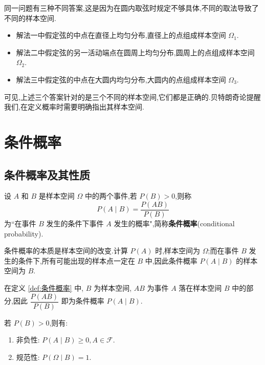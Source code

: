 \begin{note}
    \indent 同一问题有三种不同答案,这是因为在圆内取弦时规定不够具体,不同的取法导致了不同的样本空间.

    \begin{itemize}
        \item 解法一中假定弦的中点在直径上均匀分布,直径上的点组成样本空间 $\varOmega_1$.
        \item 解法二中假定弦的另一活动端点在圆周上均匀分布,圆周上的点组成样本空间 $\varOmega_2$.
        \item 解法三中假定弦的中点在大圆内均匀分布,大圆内的点组成样本空间 $\varOmega_3$.
    \end{itemize}

    可见,上述三个答案针对的是三个不同的样本空间,它们都是正确的.贝特朗奇论提醒我们,在定义概率时需要明确指出其样本空间.
\end{note}

\section{条件概率}

\subsection{条件概率及其性质}

\begin{definition}
    \indent 设 $A$ 和 $B$ 是样本空间 $\varOmega$ 中的两个事件,若 $P(B)>0$,则称
    $$
    P(A \mid B) = \dfrac{P(AB)}{P(B)}
    $$
    为``在事件 $B$ 发生的条件下事件 $A$ 发生的概率",简称\textbf{条件概率}(conditional probability).
\end{definition}

\begin{note}
    \indent 条件概率的本质是样本空间的改变.计算 $P(A)$ 时,样本空间为 $\varOmega$;而在事件 $B$ 发生的条件下,所有可能出现的样本点一定在 $B$ 中,因此条件概率 $P(A \mid B)$ 的样本空间为 $B$.

    在定义 \ref{def:条件概率} 中, $B$ 为样本空间, $AB$ 为事件 $A$ 落在样本空间 $B$ 中的部分,因此 $\dfrac{P(AB)}{P(B)}$ 即为条件概率 $P(A \mid B)$.
\end{note}

\begin{property}
    \indent 若 $P(B) > 0$,则有:
    \begin{enumerate}
        \item 非负性: $P(A \mid B) \geqslant 0, A \in \mathcal{F}$.
        \item 规范性: $P(\varOmega \mid B) = 1$.
        \item 可列可加性:若 $A_1, A_2, \cdots, A_n, \cdots$ 两两互斥,则
        $$
        P \left( \bigcup_{i=1}^{\infty} A_i \mid B \right) = \sum_{i=1}^{\infty} P(A_i \mid B)
        $$
    \end{enumerate}
\end{property}

